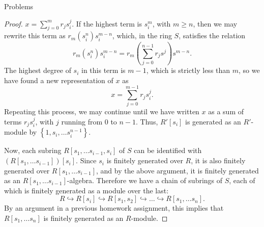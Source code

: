 \documentclass[12pt]{article}
\theoremstyle{definition}
\begin{document}
\begin{section}{Problems}
\begin{proof}
	$x = \sum_{j = 0}^{m}r_js_i^j$. If the highest term is $s_i^m$, with $m \geq n$, then we may rewrite this term as $r_m(s_i^n)s_i^{m-n}$, which, in the ring $S$, satisfies the relation
	\[r_m(s_i^n)s_i^{m-n} = r_m \left (\sum_{j = 0}^{n-1}r_js^j\right )s^{m-n}.\]
	The highest degree of $s_i$ in this term is $m-1$, which is strictly less than $m$, so we have found a new representation of $x$ as
	\[x = \sum_{j = 0}^{m-1}r_js_i^j.\]
	Repeating this process, we may continue until we have written $x$ as a sum of terms $r_js_i^j$, with $j$ running from $0$ to $n-1$. Thus, $R'[s_i]$ is generated as an $R'$-module by $\left\{ 1, s_i, \dots s_i^{n-1} \right\}$.
	\par 	Now, each subring $R[s_1, \dots s_{i-1}, s_i]$ of $S$ can be identified with $(R[s_1, \dots s_{i-1}])[s_i]$. Since $s_i$ is finitely generated over $R$, it is also finitely generated over $R[s_1, \dots s_{i-1}]$, and by the above argument, it is finitely generated as an $R[s_1, \dots s_{i-1}]$-algebra. Therefore we have a chain of subrings of $S$, each of which is finitely generated as a module over the last:
	\[R \hookrightarrow R[s_i] \hookrightarrow R[s_1, s_2] \hookrightarrow \dots \hookrightarrow R[s_1, \dots s_n].\]
	By an argument in a previous homework assignment, this implies that $R[s_1, \dots s_n]$ is finitely generated as an $R$-module.	
\end{proof}
\end{section}
\begin{thebibliography}{}

\end{thebibliography}
\end{document}
